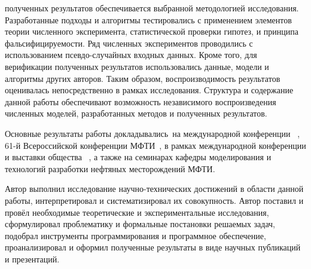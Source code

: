 {\reliability} полученных результатов обеспечивается выбранной методологией исследования.
Разработанные подходы и алгоритмы тестировались с применением элементов теории численного эксперимента, статистической проверки гипотез, и принципа фальсифицируемости.
Ряд численных экспериментов проводились с использованием псевдо-случайных входных данных.
Кроме того, для верификации полученных результатов использовались данные, модели и алгоритмы других авторов.
Таким образом, воспроизводимость результатов оценивалась непосредственно в рамках исследования.
Структура и содержание данной работы обеспечивают возможность независимого воспроизведения численных моделей, разработанных методов и полученных результатов.

{\probation}
Основные результаты работы докладывались~на международной конференции \frqq~\cite{Elizarev2022,Elizarev2020}, 61-й Всероссийской конференции МФТИ~\cite{Elizarev_MIPT_conference}, в рамках международной конференции и выставки общества \frqq~\cite{Elizarev_2019}, а также на семинарах кафедры моделирования и технологий разработки нефтяных месторождений МФТИ.

{\contribution} Автор выполнил исследование научно-технических достижений в области данной работы, интерпретировал и систематизировал их совокупность. Автор поставил и провёл необходимые теоретические и экспериментальные исследования, сформулировал проблематику и формальные постановки решаемых задач, подобрал инструменты программирования и программное обеспечение, проанализировал и оформил полученные результаты в виде научных публикаций и презентаций.

